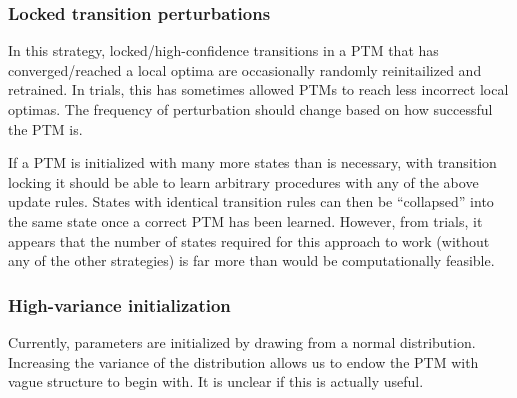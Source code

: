 \documentclass{article}
\begin{document}
\subsubsection{Locked transition perturbations}
In this strategy, locked/high-confidence transitions in a PTM that has converged/reached a local optima are occasionally randomly reinitailized and retrained. In trials, this has sometimes allowed PTMs to reach less incorrect local optimas. The frequency of perturbation should change based on how successful the PTM is.


If a PTM is initialized with many more states than is necessary, with transition locking it should be able to learn arbitrary procedures with any of the above update rules. States with identical transition rules can then be ``collapsed'' into the same state once a correct PTM has been learned. However, from trials, it appears that the number of states required for this approach to work (without any of the other strategies) is far more than would be computationally feasible. 

\subsubsection{High-variance initialization}
Currently, parameters are initialized by drawing from a normal distribution. Increasing the variance of the distribution allows us to endow the PTM with vague structure to begin with. It is unclear if this is actually useful. 
\end{document}
